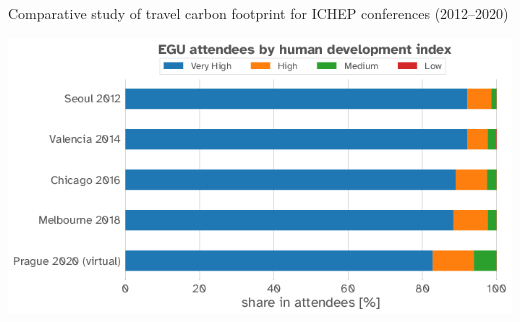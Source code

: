 \documentclass[../SustainableHEP.tex]{subfiles}
\begin{document}
\begin{casestudy}{Comparative study of travel carbon footprint for ICHEP conferences (2012--2020)}

\begin{center}
    \centering
    \captionsetup{type=figure}
    \includegraphics[width=1.\textwidth]{Sections/Figs/Travel/ICHEP_attendees.png}
    \caption[ICHEP participants by development index]%
        {The fraction of participants, categorised by human development index, HDI~\cite{hdiref} attending the last 5 instances of ICHEP.\label{fig:DevelopmentIndex}}
\end{center}


\end{casestudy}

\end{document}
